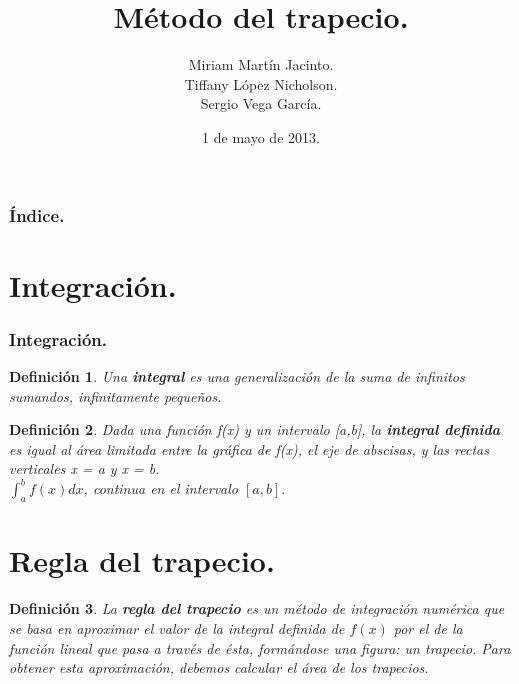 \documentclass{beamer}
\title[Integración]{Método del trapecio.}
\author[Grupo-2D]{Miriam Martín Jacinto.\\Tiffany López Nicholson.\\Sergio Vega García.}
\date[01/05/2013]{1 de mayo de 2013.}
\newtheorem{definicion}{Definición}
\begin{document}
  \begin{frame}
    \titlepage
  \end{frame}
  \begin{frame}
    \frametitle{Índice.}
    \tableofcontents[pausesections]
  \end{frame}
  \section{Integración.}
  \begin{frame}
    \frametitle{Integración.}
      \begin{definicion}
	Una \textbf{integral} es una generalización de la suma de infinitos sumandos, infinitamente pequeños.
      \end{definicion}
	
      \begin{definicion}
	Dada una función f(x) y un intervalo [a,b], la \textbf{integral definida} es igual al área limitada entre la gráfica de f(x), el eje de abscisas, y las rectas verticales x = a y x = b.\\
	$\int_{a}^{b} f(x) dx$, continua en el intervalo $[a, b].$
      \end{definicion}
  \end{frame}
  \section{Regla del trapecio.}
  \begin{frame}
    \begin{definicion}
      La \textbf{regla del trapecio} es un método de integración numérica que se basa en aproximar el valor de la integral definida de $f(x)$ por el de la función lineal que pasa a través de ésta, formándose una figura: un trapecio. Para obtener esta aproximación, debemos calcular el área de los trapecios.
    \end{definicion}
  \end{frame}
\end{document}
